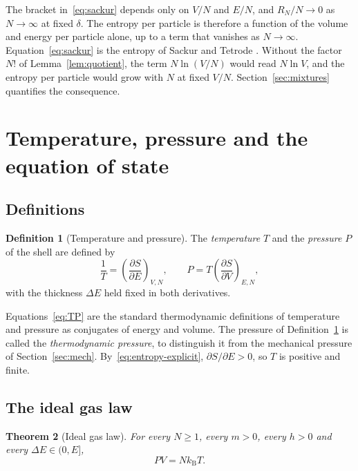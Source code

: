 \documentclass[11pt,a4paper]{article}
\newtheorem{theorem}{Theorem}[section]
\theoremstyle{definition}
\newtheorem{definition}[theorem]{Definition}
\theoremstyle{remark}
\newcommand{\kB}{k_{\mathrm{B}}}
\begin{document}
The bracket in~\eqref{eq:sackur} depends only on $V/N$ and $E/N$, and $R_N/N\to0$ as $N\to\infty$ at fixed $\delta$.
The entropy per particle is therefore a function of the volume and energy per particle alone, up to a term that vanishes as $N\to\infty$.
Equation~\eqref{eq:sackur} is the entropy of Sackur and Tetrode \citep{sackur1911,tetrode1912}.
Without the factor $N!$ of Lemma~\ref{lem:quotient}, the term $N\ln(V/N)$ would read $N\ln V$, and the entropy per particle would grow with $N$ at fixed $V/N$.
Section~\ref{sec:mixtures} quantifies the consequence.

\section{Temperature, pressure and the equation of state}
\label{sec:laws}

\subsection{Definitions}

\begin{definition}[Temperature and pressure]
\label{def:TP}
The \emph{temperature} $T$ and the \emph{pressure} $P$ of the shell are defined by
\begin{equation}
\frac1T=\left(\frac{\partial S}{\partial E}\right)_{V,N},\qquad
P=T\left(\frac{\partial S}{\partial V}\right)_{E,N},
\label{eq:TP}
\end{equation}
with the thickness $\Delta E$ held fixed in both derivatives.
\end{definition}

Equations~\eqref{eq:TP} are the standard thermodynamic definitions of temperature and pressure as conjugates of energy and volume.
The pressure of Definition~\ref{def:TP} is called the \emph{thermodynamic pressure}, to distinguish it from the mechanical pressure of Section~\ref{sec:mech}.
By~\eqref{eq:entropy-explicit}, $\partial S/\partial E>0$, so $T$ is positive and finite.

\subsection{The ideal gas law}

\begin{theorem}[Ideal gas law]
\label{thm:igl}
For every $N\ge1$, every $m>0$, every $h>0$ and every $\Delta E\in(0,E]$,
\begin{equation}
PV=N\kB T.
\label{eq:igl}
\end{equation}
\end{theorem}
\end{document}
